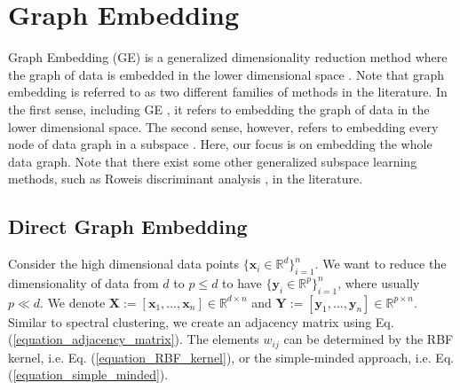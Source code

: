 \documentclass[lang=cn,10pt]{gorgeousnbook}
\numberwithin{equation}{section}%
\numberwithin{figure}{section}%
\begin{document}
\section{Graph Embedding}\label{section_graph_embedding}

Graph Embedding (GE) \cite{yan2005graph,yan2006graph} is a generalized dimensionality reduction method where the graph of data is embedded in the lower dimensional space \cite{chang2014graph}. 
Note that graph embedding is referred to as two different families of methods in the literature. In the first sense, including GE \cite{yan2005graph,yan2006graph}, it refers to embedding the graph of data in the lower dimensional space. The second sense, however, refers to embedding every node of data graph in a subspace \cite{goyal2018graph}. Here, our focus is on embedding the whole data graph. 
Note that there exist some other generalized subspace learning methods, such as Roweis discriminant analysis \cite{ghojogh2020generalized}, in the literature.

\subsection{Direct Graph Embedding}

Consider the high dimensional data points $\{\boldsymbol{x}_i \in \mathbb{R}^d\}_{i=1}^n$. We want to reduce the dimensionality of data from $d$ to $p \leq d$ to have $\{\boldsymbol{y}_i \in \mathbb{R}^p\}_{i=1}^n$, where usually $p \ll d$.
We denote $\boldsymbol{X} := [\boldsymbol{x}_1, \dots, \boldsymbol{x}_n] \in \mathbb{R}^{d \times n}$ and $\boldsymbol{Y} := [\boldsymbol{y}_1, \dots, \boldsymbol{y}_n] \in \mathbb{R}^{p \times n}$.
Similar to spectral clustering, we create an adjacency matrix using Eq. (\ref{equation_adjacency_matrix}). The elements $w_{ij}$ can be determined by the RBF kernel, i.e. Eq. (\ref{equation_RBF_kernel}), or the simple-minded approach, i.e. Eq. (\ref{equation_simple_minded}).
\end{document}
